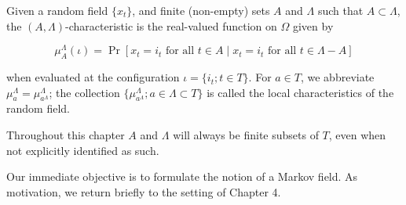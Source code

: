 Given a random field $\{x_t\}$, and finite (non-empty) sets $A$ and $\Lambda$ such that $A \subset \Lambda$, the $(A, \Lambda)$-characteristic is the real-valued function on $\Omega$ given by

$$\mu_A^\Lambda(\iota) = \Pr[x_t = i_t \text{ for all } t \in A \mid x_t = i_t \text{ for all } t \in \Lambda - A]$$

when evaluated at the configuration $\iota = \{i_t; t \in T\}$. For $a \in T$, we abbreviate $\mu_a^\Lambda = \mu_{a^\Lambda}^\Lambda$; the collection $\{\mu_{a^\Lambda}^\Lambda; a \in \Lambda \subset T\}$ is called the local characteristics of the random field.

Throughout this chapter $A$ and $\Lambda$ will always be finite subsets of $T$, even when not explicitly identified as such.

Our immediate objective is to formulate the notion of a Markov field. As motivation, we return briefly to the setting of Chapter 4.
